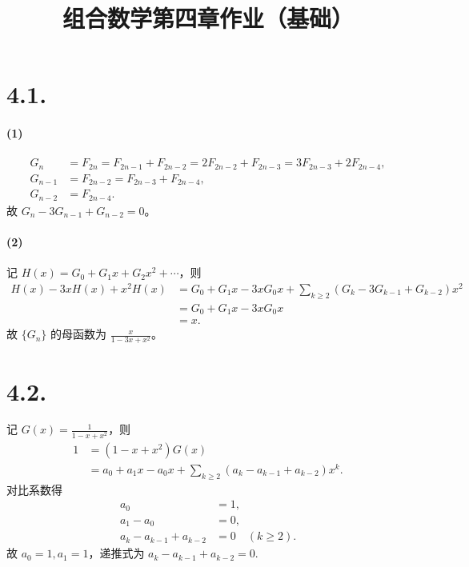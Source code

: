 \documentclass{article}
\title{组合数学\quad 第四章作业（基础）}
\author{}
\begin{document}
\maketitle

\section*{4.1.}
\paragraph{(1)}
\begin{align}
    G_n&=F_{2n}=F_{2n-1}+F_{2n-2}=2F_{2n-2}+F_{2n-3}=3F_{2n-3}+2F_{2n-4}, \\
    G_{n-1}&=F_{2n-2}=F_{2n-3}+F_{2n-4}, \\
    G_{n-2}&=F_{2n-4}.
\end{align}
故 $G_n-3G_{n-1}+G_{n-2}=0$。

\paragraph{(2)}
记 $H(x)=G_0+G_1x+G_2x^2+\cdots$，则
\begin{align}
    H(x)-3xH(x)+x^2H(x)&=G_0+G_1x-3xG_0x+\sum_{k\ge 2}(G_k-3G_{k-1}+G_{k-2})x^2 \\
    &=G_0+G_1x-3xG_0x \\
    &=x.
\end{align}
故 $\{G_n\}$ 的母函数为 $\frac{x}{1-3x+x^2}$。

\section*{4.2.}
记 $G(x)=\frac{1}{1-x+x^2}$，则
\begin{align}
    1&=(1-x+x^2)G(x) \\
    &=a_0 + a_1x-a_0x + \sum_{k\ge 2}(a_k-a_{k-1}+a_{k-2})x^k.
\end{align}
对比系数得
\begin{align}
    a_0 &= 1, \\
    a_1-a_0 &= 0, \\
    a_k-a_{k-1}+a_{k-2} &= 0\quad (k\ge 2).
\end{align}
故 $a_0=1,a_1=1$，递推式为 $a_k-a_{k-1}+a_{k-2}=0$.
\end{document}
